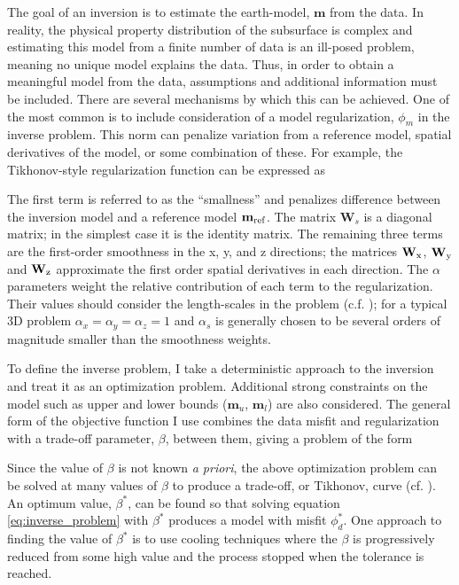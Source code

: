 The goal of an inversion is to estimate the earth-model, $\mathbf{m}$ from the data. In reality, the physical property distribution of the subsurface is complex and estimating this model from a finite number of data is an ill-posed problem, meaning no unique model explains the data. Thus, in order to obtain a meaningful model from the data, assumptions and additional information must be included. There are several mechanisms by which this can be achieved. One of the most common is to include consideration of a model regularization, $\phi_m$ in the inverse problem. This norm can penalize variation from a reference model, spatial derivatives of the model, or some combination of these. For example, the Tikhonov-style regularization function \citep{Tikhonov1977} can be expressed as

The first term is referred to as the ``smallness'' and penalizes difference between the inversion model and a reference model $\mathbf{m_{\rm ref}}$. The matrix $\mathbf{W}_s$ is a diagonal matrix; in the simplest case it is the identity matrix. The remaining three terms are the first-order smoothness in the x, y, and z directions; the matrices $\mathbf{W}_{\rm x}$, $\mathbf{W}_{\rm y}$ and $\mathbf{W}_{\rm z}$ approximate the first order spatial derivatives in each direction. The $\alpha$ parameters weight the relative contribution of each term to the regularization. Their values should consider the length-scales in the problem (c.f. \cite{Oldenburg2005}); for a typical 3D problem $\alpha_x = \alpha_y = \alpha_z = 1$ and $\alpha_s$ is generally chosen to be several orders of magnitude smaller than the smoothness weights.

To define the inverse problem, I take a deterministic approach to the inversion and treat it as an optimization problem. Additional strong constraints on the model such as upper and lower bounds ($\mathbf{m}_u$, $\mathbf{m}_l$) are also considered. The general form of the objective function I use combines the data misfit and regularization with a trade-off parameter, $\beta$, between them, giving a problem of the form

Since the value of $\beta$ is not known \emph{a priori}, the above optimization problem can be solved at many values of $\beta$ to produce a trade-off, or Tikhonov, curve (cf. \cite{Parker1994}). An optimum value, $\beta^*$, can be found so that solving equation \ref{eq:inverse_problem} with $\beta^*$ produces a model with misfit $\phi_d^*$. One approach to finding the value of $\beta^*$ is to use cooling techniques where the $\beta$ is progressively reduced from some high value and the process stopped when the tolerance is reached.

